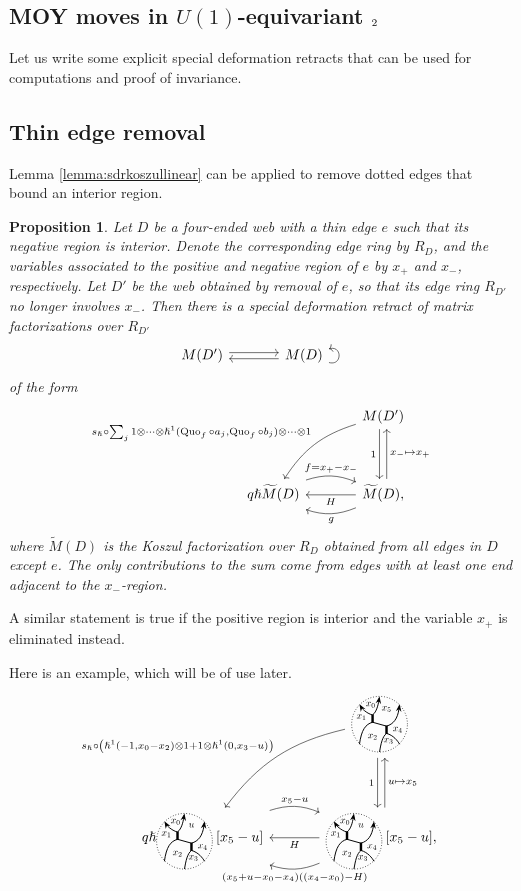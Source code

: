 \documentclass{article}
\newcommand{\uone}{U(1)}
\DeclareMathOperator{\Quo}{Quo}
\newcommand{\sdr}[5]{%
  \begin{tikzcd}[column sep=large, ampersand replacement=\&]
    {#1} \arrow[r, "#3", shift left=0.5ex,] \arrow[r, leftarrow, "#4", shift right=0.5ex, swap] \& 
    {#2} \arrow[loop right, distance=1em, in=15, out=-15, "#5",swap]
  \end{tikzcd}%
}
\theoremstyle{plain} %
\newtheorem{proposition}[theorem]{Proposition}
\theoremstyle{definition} %
\theoremstyle{remark} %
\begin{document}
%

\subsection{MOY moves in $\uone$-equivariant $\sl_2$}

Let us write some explicit special deformation retracts that can be used for computations and proof of invariance. 

\subsection{Thin edge removal}
Lemma \ref{lemma:sdrkoszullinear} can be applied to remove dotted edges that bound an interior region.
\begin{proposition}
Let $D$ be a four-ended web with a thin edge $e$ such that its negative region is interior. Denote the corresponding edge ring by $R_D$, and the variables associated to the positive and negative region of $e$ by $x_+$ and $x_-$, respectively. Let $D'$ be the web obtained by removal of $e$, so that its edge ring $R_{D'}$ no longer involves $x_-$. Then there is a special deformation retract of matrix factorizations over $R_{D'}$
$$\sdr{M(D')}{M(D)}{}{}{}$$ 
of the form
 $$\begin{tikzcd}[column sep=large, ]
    &M(D')\ar[dd, shift right=0.6ex, "1", swap]\ar[dd, leftarrow, shift left=0.6ex, "x_-\mapsto x_+"]\arrow[ddl, "{s_\hslash\circ\sum_{j}1\otimes\cdots \otimes\hslash^1(\Quo_f\circ a_j,\Quo_f\circ b_j)\otimes\cdots\otimes 1}", bend right=20, swap]\\\\
    q\hslash \widetilde M(D)\arrow[r, "f=x_+-x_-", shift left=0.5ex, bend left=20]& \widetilde M(D)\ar[l, "H"]\arrow[l, "g", shift left=0.5ex, bend left=20], 
\end{tikzcd}$$
where $\widetilde M(D)$ is the Koszul factorization over $R_D$ obtained from all edges in $D$ except $e$. The only contributions to the sum come from edges with at least one end adjacent to the $x_-$-region.
\end{proposition}

A similar statement is true if the positive region is interior and the variable $x_+$ is eliminated instead.

Here is an example, which will be of use later.
\[
\begin{tikzcd}[column sep=large, ]
    &\scalebox{0.7}{\ThickLThickRStandard} \ar[dd, shift right=0.6ex, "1", swap]\ar[dd, leftarrow, shift left=0.6ex, "u\mapsto x_5"]\arrow[ddl, "{s_\hslash\circ\left(\hslash^1(-1,x_0-x_2)\otimes 1+1\otimes\hslash^1(0,x_3-u)\right)}", bend right=20, swap]\\\\
    q\hslash \scalebox{0.7}{\ThickLThickR{x_0}{x_1}{x_2}{x_3}{x_4}{u}}[x_5-u]\arrow[r, "x_5-u", shift left=0.5ex, bend left=20]& \scalebox{0.7}{\ThickLThickR{x_0}{x_1}{x_2}{x_3}{x_4}{u}}[x_5-u]\ar[l, "H"]\arrow[l, "(x_5+u-x_0-x_4)((x_4-x_0)-H)", shift left=0.5ex, bend left=20], 
\end{tikzcd}
\]
\end{document}
